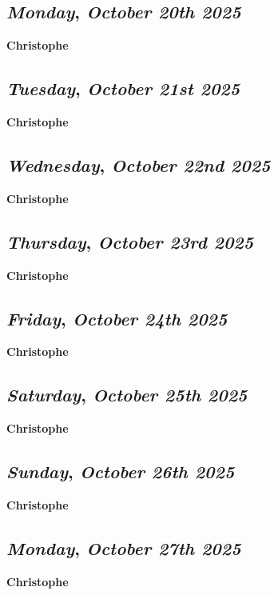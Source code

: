 \def\day{\textit{October 20th 2025}}
\def\weekday{\textit{Monday}}
\subsection*{\weekday, \day}
\textbf {Christophe}

\def\day{\textit{October 21st 2025}}
\def\weekday{\textit{Tuesday}}
\subsection*{\weekday, \day}
\textbf {Christophe}

\def\day{\textit{October 22nd 2025}}
\def\weekday{\textit{Wednesday}}
\subsection*{\weekday, \day}
\textbf {Christophe}

\def\day{\textit{October 23rd 2025}}
\def\weekday{\textit{Thursday}}
\subsection*{\weekday, \day}
\textbf {Christophe}

\def\day{\textit{October 24th 2025}}
\def\weekday{\textit{Friday}}
\subsection*{\weekday, \day}
\textbf {Christophe}

\def\day{\textit{October 25th 2025}}
\def\weekday{\textit{Saturday}}
\subsection*{\weekday, \day}
\textbf {Christophe}

\def\day{\textit{October 26th 2025}}
\def\weekday{\textit{Sunday}}
\subsection*{\weekday, \day}
\textbf {Christophe}

\def\day{\textit{October 27th 2025}}
\def\weekday{\textit{Monday}}
\subsection*{\weekday, \day}
\textbf {Christophe}

\def\day{\textit{October 28th 2025}}
\def\weekday{\textit{Tuesday}}
